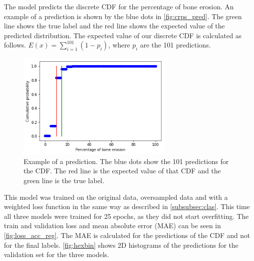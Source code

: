 \documentclass[12pt]{article}
\begin{document}
The model predicts the discrete CDF for the percentage of bone erosion. An example of a prediction is shown by the blue dots in \autoref{fig:crps_pred}. The green line shows the true label and the red line shows the expected value of the predicted distribution. The expected value of our discrete CDF is calculated as follows. $E(x) = \sum_{i=1}^{101} \left ( 1 - p_i \right )$, where $p_i$ are the 101 predictions.

\begin{figure}[ht]
\includegraphics[width=3in]{crps_pred}	
\caption{Example of a prediction. The blue dots show the 101 predictions for the CDF. The red line is the expected value of that CDF and the green line is the true label.}
\label{fig:crps_pred}
\end{figure}

This model was trained on the original data, oversampled data and with a weighted loss function in the same way as described in \autoref{subsubsec:clas}. This time all three models were trained for 25 epochs, as they did not start overfitting. The train and validation loss and mean absolute error (MAE) can be seen in \autoref{fig:loss_acc_reg}. The MAE is calculated for the predictions of the CDF and not for the final labels. \autoref{fig:hexbin} shows 2D histograms of the predictions for the validation set for the three models. 
\end{document}
